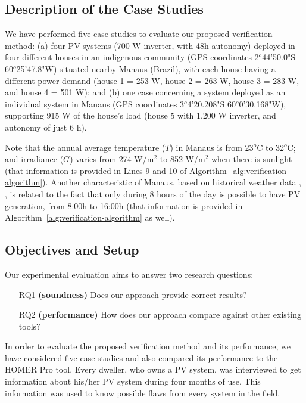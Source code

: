 \documentclass[journal]{IEEEtran}
\begin{document}
\subsection{Description of the Case Studies}

We have performed five case studies to evaluate our proposed verification method: (a) four PV systems (700 W inverter, with 48h autonomy) deployed in four different houses in an indigenous community (GPS coordinates 2$^{o}$44'50.0"S 60$^{o}$25'47.8"W) situated nearby Manaus (Brazil), with each house having a different power demand (house 1 = 253 W, house 2 = 263 W, house 3 = 283 W, and house 4 = 501 W); and (b) one case concerning a system deployed as an individual system in Manaus (GPS coordinates 3$^{o}$4'20.208"S 60$^{o}$0'30.168"W), supporting 915 W of the house's load (house 5 with 1,200 W inverter, and autonomy of just 6 h). 

Note that the annual average temperature ($T$) in Manaus is from 23$^{o}$C to 32$^{o}$C; and irradiance ($G$) varies from 274 W/m$^{2}$ to 852 W/m$^{2}$ when there is sunlight (that information is provided in Lines 9 and 10 of Algorithm~\ref{alg:verification-algorithm}). Another characteristic of Manaus, based on historical weather data \cite{Temperature}, \cite{Irradiance}, is related to the fact that only during 8 hours of the day is possible to have PV generation, from 8:00h to 16:00h (that information is provided in Algorithm~\ref{alg:verification-algorithm} as well).


\subsection{Objectives and Setup}
Our experimental evaluation aims to answer two research questions:
%
\begin{enumerate}
\item[RQ1] \textbf{(soundness)} Does our approach provide correct results?
\item[RQ2] \textbf{(performance)} How does our approach compare against other existing tools?
\end{enumerate}

In order to evaluate the proposed verification method and its performance, we have considered five case studies and also compared its performance to the HOMER Pro tool. Every dweller, who owns a PV system, was interviewed to get information about his/her PV system during four months of use. This information was used to know possible flaws from every system in the field.
\end{document}
